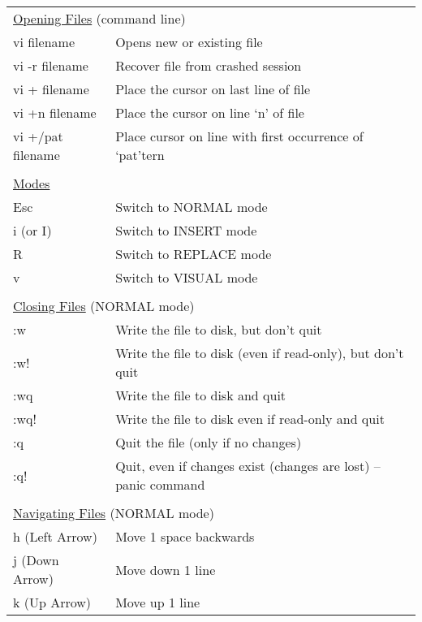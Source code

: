 \documentclass[11pt,a4paper,oneside]{article}
\begin{document}

\begin{table}
\begin{tabular}{p{4.5cm} l}
\multicolumn{2}{l}{\underline{Opening Files} (command line)} \\
vi filename & Opens new or existing file \\
vi -r filename & Recover file from crashed session \\
vi + filename & Place the cursor on last line of file \\
vi +n filename & Place the cursor on line `n' of file \\
vi +/pat filename & Place cursor on line with first occurrence of `pat'tern \\
 & \\[-1.5ex]
\multicolumn{2}{l}{\underline{Modes}} \\
 Esc & Switch to NORMAL mode \\
 i (or I) & Switch to INSERT mode \\
 R & Switch to REPLACE mode \\
 v & Switch to VISUAL mode \\
 & \\[-1.5ex]
\multicolumn{2}{l}{\underline{Closing Files} (NORMAL mode)} \\
:w & Write the file to disk, but don't quit \\
:w! & Write the file to disk (even if read-only), but don't quit \\
:wq & Write the file to disk and quit \\
:wq! & Write the file to disk even if read-only and quit \\
:q & Quit the file (only if no changes) \\
:q! & Quit, even if changes exist (changes are lost) -- panic command \\
 & \\[-1.5ex]
\multicolumn{2}{l}{\underline{Navigating Files} (NORMAL mode)} \\
h (Left Arrow) & Move 1 space backwards \\
j (Down Arrow) & Move down 1 line \\
k (Up Arrow) & Move up 1 line \\

\end{tabular}
\end{table}
\end{document}
